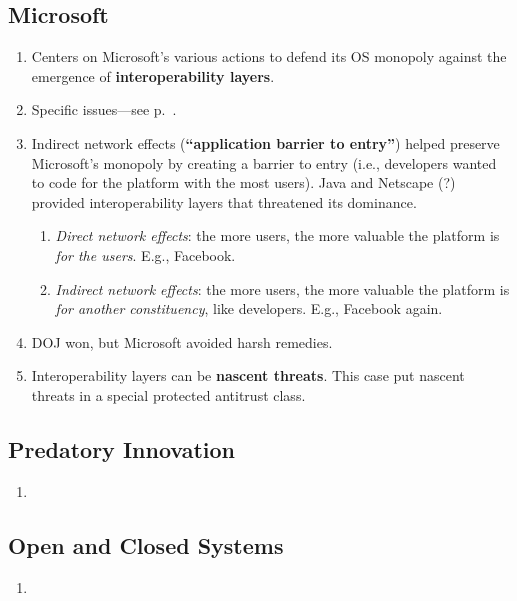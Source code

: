 \subsection{Microsoft}

\begin{enumerate}
    \item Centers on Microsoft's various actions to defend its OS monopoly 
    against the emergence of \textbf{interoperability layers}.
    \item Specific issues---see p.~\pageref{sub:msft-issues}.
    \item Indirect network effects (\textbf{``application barrier to entry''}) 
    helped preserve Microsoft's monopoly by creating a barrier to entry (i.e., 
    developers wanted to code for the platform with the most users). Java and 
    Netscape (?) provided interoperability layers that threatened its 
    dominance.
    \begin{enumerate}
        \item \emph{Direct network effects}: the more users, the more valuable 
        the platform is \emph{for the users}. E.g., Facebook.
        \item \emph{Indirect network effects}: the more users, the more 
        valuable the platform is \emph{for another constituency}, like 
        developers. E.g., Facebook again.
    \end{enumerate}
    \item DOJ won, but Microsoft avoided harsh remedies.
    \item Interoperability layers can be \textbf{nascent threats}. This case 
    put nascent threats in a special protected antitrust class.
\end{enumerate}

\subsection{Predatory Innovation} %

\begin{enumerate}
    \item 
\end{enumerate}

\subsection{Open and Closed Systems} %

\begin{enumerate}
    \item 
\end{enumerate}

